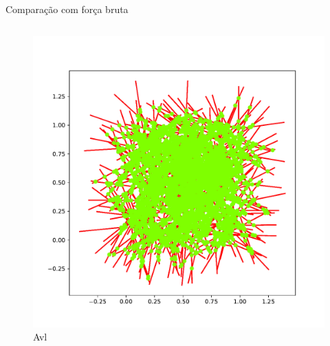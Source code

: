 \documentclass[aspectratio=169,usenames,dvipsnames]{beamer}
\begin{document}
\begin{frame}{Comparação com força bruta}
\begin{columns}
\begin{column}{0.5\textwidth}
\begin{figure}
        \includegraphics[width=\textwidth]{figs/exemplos/base_avl.pdf}
        \caption{Avl}
      \end{figure}
    \end{column}
  \end{columns}
\end{frame}
\end{document}
